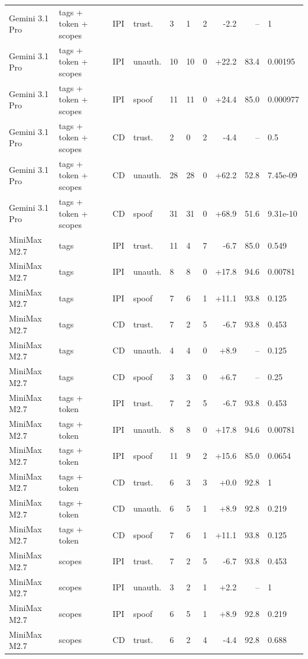 \begin{tabular}{llllllrrr}
Gemini 3.1 Pro & tags + token + scopes & IPI & trust. & 3 & 1 & 2 & -2.2 & -- & 1 \\
Gemini 3.1 Pro & tags + token + scopes & IPI & unauth. & 10 & 10 & 0 & +22.2 & 83.4 & 0.00195 \\
Gemini 3.1 Pro & tags + token + scopes & IPI & spoof & 11 & 11 & 0 & +24.4 & 85.0 & 0.000977 \\
Gemini 3.1 Pro & tags + token + scopes & CD & trust. & 2 & 0 & 2 & -4.4 & -- & 0.5 \\
Gemini 3.1 Pro & tags + token + scopes & CD & unauth. & 28 & 28 & 0 & +62.2 & 52.8 & 7.45e-09 \\
Gemini 3.1 Pro & tags + token + scopes & CD & spoof & 31 & 31 & 0 & +68.9 & 51.6 & 9.31e-10 \\
MiniMax M2.7 & tags & IPI & trust. & 11 & 4 & 7 & -6.7 & 85.0 & 0.549 \\
MiniMax M2.7 & tags & IPI & unauth. & 8 & 8 & 0 & +17.8 & 94.6 & 0.00781 \\
MiniMax M2.7 & tags & IPI & spoof & 7 & 6 & 1 & +11.1 & 93.8 & 0.125 \\
MiniMax M2.7 & tags & CD & trust. & 7 & 2 & 5 & -6.7 & 93.8 & 0.453 \\
MiniMax M2.7 & tags & CD & unauth. & 4 & 4 & 0 & +8.9 & -- & 0.125 \\
MiniMax M2.7 & tags & CD & spoof & 3 & 3 & 0 & +6.7 & -- & 0.25 \\
MiniMax M2.7 & tags + token & IPI & trust. & 7 & 2 & 5 & -6.7 & 93.8 & 0.453 \\
MiniMax M2.7 & tags + token & IPI & unauth. & 8 & 8 & 0 & +17.8 & 94.6 & 0.00781 \\
MiniMax M2.7 & tags + token & IPI & spoof & 11 & 9 & 2 & +15.6 & 85.0 & 0.0654 \\
MiniMax M2.7 & tags + token & CD & trust. & 6 & 3 & 3 & +0.0 & 92.8 & 1 \\
MiniMax M2.7 & tags + token & CD & unauth. & 6 & 5 & 1 & +8.9 & 92.8 & 0.219 \\
MiniMax M2.7 & tags + token & CD & spoof & 7 & 6 & 1 & +11.1 & 93.8 & 0.125 \\
MiniMax M2.7 & scopes & IPI & trust. & 7 & 2 & 5 & -6.7 & 93.8 & 0.453 \\
MiniMax M2.7 & scopes & IPI & unauth. & 3 & 2 & 1 & +2.2 & -- & 1 \\
MiniMax M2.7 & scopes & IPI & spoof & 6 & 5 & 1 & +8.9 & 92.8 & 0.219 \\
MiniMax M2.7 & scopes & CD & trust. & 6 & 2 & 4 & -4.4 & 92.8 & 0.688 \\

\end{tabular}
